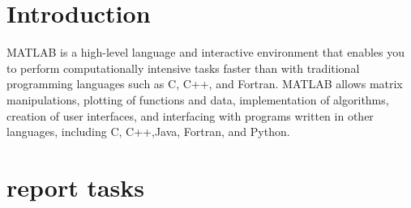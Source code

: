 \documentclass[12pt,a4paper]{article}
\begin{document}
\section{Introduction}
MATLAB is a high-level language and interactive environment that enables you to perform computationally intensive tasks faster than with traditional programming languages such as C, C++, and Fortran. MATLAB allows matrix manipulations, plotting of functions and data, implementation of algorithms, creation of user interfaces, and interfacing with programs written in other languages, including C, C++,Java, Fortran, and Python.

\section{report tasks}
\end{document}
